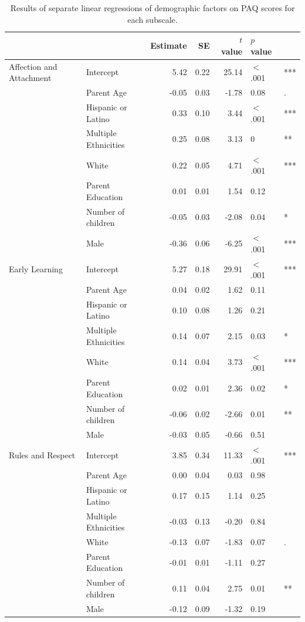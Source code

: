 \documentclass[floatsintext,man]{apa6}
\theoremstyle{definition}
\theoremstyle{definition}
\theoremstyle{definition}
\theoremstyle{remark}
\begin{document}
\begin{table}[b]
\centering
\begin{tabular}{llrrrll}
  &  & Estimate & SE & $t$ value & $p$ value &  \\ 
  \hline
Affection and Attachment & Intercept & 5.42 & 0.22 & 25.14 & $<$ .001 & *** \\ 
   & Parent Age & -0.05 & 0.03 & -1.78 & 0.08 & . \\ 
   & Hispanic or Latino & 0.33 & 0.10 & 3.44 & $<$ .001 & *** \\ 
   & Multiple Ethnicities & 0.25 & 0.08 & 3.13 & 0 & ** \\ 
   & White & 0.22 & 0.05 & 4.71 & $<$ .001 & *** \\ 
   & Parent Education & 0.01 & 0.01 & 1.54 & 0.12 &  \\ 
   & Number of children & -0.05 & 0.03 & -2.08 & 0.04 & * \\ 
   & Male & -0.36 & 0.06 & -6.25 & $<$ .001 & *** \\ 
   \hline
Early Learning & Intercept & 5.27 & 0.18 & 29.91 & $<$ .001 & *** \\ 
   & Parent Age & 0.04 & 0.02 & 1.62 & 0.11 &  \\ 
   & Hispanic or Latino & 0.10 & 0.08 & 1.26 & 0.21 &  \\ 
   & Multiple Ethnicities & 0.14 & 0.07 & 2.15 & 0.03 & * \\ 
   & White & 0.14 & 0.04 & 3.73 & $<$ .001 & *** \\ 
   & Parent Education & 0.02 & 0.01 & 2.36 & 0.02 & * \\ 
   & Number of children & -0.06 & 0.02 & -2.66 & 0.01 & ** \\ 
   & Male & -0.03 & 0.05 & -0.66 & 0.51 &  \\ 
   \hline
Rules and Respect & Intercept & 3.85 & 0.34 & 11.33 & $<$ .001 & *** \\ 
   & Parent Age & 0.00 & 0.04 & 0.03 & 0.98 &  \\ 
   & Hispanic or Latino & 0.17 & 0.15 & 1.14 & 0.25 &  \\ 
   & Multiple Ethnicities & -0.03 & 0.13 & -0.20 & 0.84 &  \\ 
   & White & -0.13 & 0.07 & -1.83 & 0.07 & . \\ 
   & Parent Education & -0.01 & 0.01 & -1.11 & 0.27 &  \\ 
   & Number of children & 0.11 & 0.04 & 2.75 & 0.01 & ** \\ 
   & Male & -0.12 & 0.09 & -1.32 & 0.19 &  \\ 
  \end{tabular}
\caption{Results of separate linear regressions of demographic factors on PAQ scores for each subscale.} 
\end{table}
\end{document}
